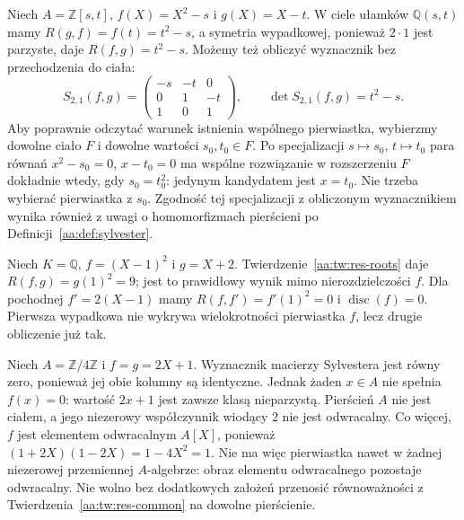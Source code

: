 \begin{przyklad}\label{aa:prz:res-elimination}
Niech $A=\mathbb Z[s,t]$, $f(X)=X^2-s$ i $g(X)=X-t$.
W ciele ułamków $\mathbb Q(s,t)$ mamy $R(g,f)=f(t)=t^2-s$,
a symetria wypadkowej, ponieważ $2\cdot1$ jest parzyste,
daje $R(f,g)=t^2-s$. Możemy też obliczyć wyznacznik
bez przechodzenia do ciała:
\[
 S_{2,1}(f,g)=
 \begin{pmatrix}-s&-t&0\\0&1&-t\\1&0&1\end{pmatrix},
 \qquad\det S_{2,1}(f,g)=t^2-s.
\]
Aby poprawnie odczytać warunek istnienia wspólnego pierwiastka,
wybierzmy dowolne ciało $F$ i dowolne wartości $s_0,t_0\in F$.
Po specjalizacji $s\mapsto s_0$, $t\mapsto t_0$ para równań
$x^2-s_0=0$, $x-t_0=0$ ma wspólne rozwiązanie w rozszerzeniu $F$
dokładnie wtedy, gdy $s_0=t_0^2$: jedynym kandydatem jest $x=t_0$.
Nie trzeba wybierać pierwiastka z $s_0$. Zgodność tej specjalizacji
z obliczonym wyznacznikiem wynika również z uwagi o homomorfizmach
pierścieni po Definicji~\ref{aa:def:sylvester}.
\end{przyklad}

\begin{przyklad}\label{aa:prz:res-repeated}
Niech $K=\mathbb Q$, $f=(X-1)^2$ i $g=X+2$.
Twierdzenie~\ref{aa:tw:res-roots} daje
$R(f,g)=g(1)^2=9$; jest to prawidłowy wynik mimo
nierozdzielczości $f$. Dla pochodnej $f'=2(X-1)$ mamy
$R(f,f')=f'(1)^2=0$ i $\operatorname{disc}(f)=0$.
Pierwsza wypadkowa nie wykrywa wielokrotności pierwiastka
$f$, lecz drugie obliczenie już tak.
\end{przyklad}

\begin{przyklad}\label{aa:prz:res-zero-divisors}
Niech $A=\mathbb Z/4\mathbb Z$ i $f=g=2X+1$.
Wyznacznik macierzy Sylvestera jest równy zero, ponieważ
jej obie kolumny są identyczne. Jednak żaden $x\in A$
nie spełnia $f(x)=0$: wartość $2x+1$ jest zawsze klasą
nieparzystą. Pierścień $A$ nie jest ciałem, a jego niezerowy
współczynnik wiodący $2$ nie jest odwracalny.
Co więcej, $f$ jest elementem odwracalnym $A[X]$, ponieważ
$(1+2X)(1-2X)=1-4X^2=1$. Nie ma więc pierwiastka nawet
w żadnej niezerowej przemiennej $A$-algebrze: obraz elementu
odwracalnego pozostaje odwracalny. Nie wolno bez dodatkowych
założeń przenosić równoważności z
Twierdzenia~\ref{aa:tw:res-common} na dowolne pierścienie.
\end{przyklad}
